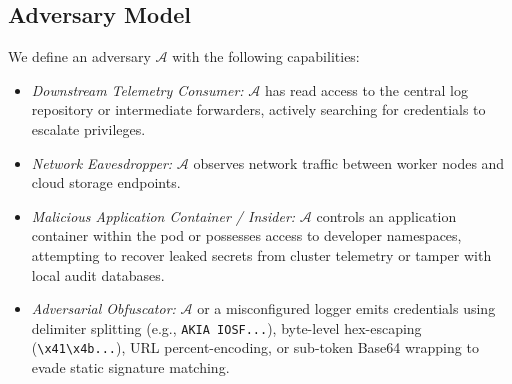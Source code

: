 \documentclass[conference]{IEEEtran}
\begin{document}
\subsection{Adversary Model}
We define an adversary $\mathcal{A}$ with the following capabilities:
\begin{itemize}
    \item \textit{Downstream Telemetry Consumer:} $\mathcal{A}$ has read access to the central log repository or intermediate forwarders, actively searching for credentials to escalate privileges.
    \item \textit{Network Eavesdropper:} $\mathcal{A}$ observes network traffic between worker nodes and cloud storage endpoints.
    \item \textit{Malicious Application Container / Insider:} $\mathcal{A}$ controls an application container within the pod or possesses access to developer namespaces, attempting to recover leaked secrets from cluster telemetry or tamper with local audit databases.
    \item \textit{Adversarial Obfuscator:} $\mathcal{A}$ or a misconfigured logger emits credentials using delimiter splitting (e.g., \texttt{AKIA IOSF...}), byte-level hex-escaping (\texttt{\textbackslash x41\textbackslash x4b...}), URL percent-encoding, or sub-token Base64 wrapping to evade static signature matching.
\end{itemize}
\end{document}
